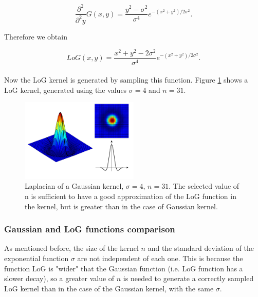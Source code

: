 \documentclass{ipol}
\numberwithin{equation}{section}
\numberwithin{table}{section}
\numberwithin{figure}{section}
\begin{document}
\begin{equation} 
	\frac{\partial^2}{\partial^2 y}G(x,y)=\frac{y^2-\sigma^2}{\sigma^4}e^{-(x^2+y^2)/2\sigma^2}.
\end{equation}

Therefore we obtain

\begin{equation}
	\label{eq:log_function}
	LoG(x,y)=\frac{x^2+y^2-2\sigma^2}{\sigma^4}e^{-(x^2+y^2)/2\sigma^2}.
\end{equation}\\

Now the LoG kernel is generated by sampling this function. Figure \ref{fig:log_kernel} shows a LoG kernel, generated using the values $\sigma=4$ and $n=31$.

\begin{figure}
	\centering
	\includegraphics[width=0.5\textwidth]{kernel_log.pdf}
	\caption{Laplacian of a Gaussian kernel, $\sigma=4$, $n=31$. The selected value of n is sufficient 
to have a good approximation of the LoG function in the kernel, but is greater than in the case of 
Gaussian kernel.}
	\label{fig:log_kernel}
\end{figure}


\subsubsection{Gaussian and LoG functions comparison}

As mentioned before, the size of the kernel $n$ and the standard deviation of the exponential function 
$\sigma$ are not independent of each one. This is because the function LoG is "wider" that the 
Gaussian function (i.e. LoG function has a slower decay), so a greater value of $n$ is needed to 
generate a correctly sampled LoG kernel than in the case of the Gaussian kernel, with the same $\sigma$.\\
\end{document}
